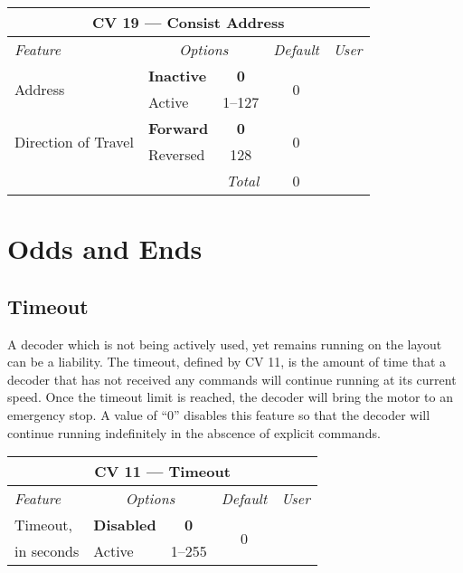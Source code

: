 \documentclass[12pt,letterpaper,draft]{memoir} %
\begin{document}
\label{CV19}
\begin{center}
\begin{tabular}{|l|lc|c|c|}
\hline
\multicolumn{5}{|c|}{\textbf{CV 19 --- Consist Address}} \\ \hline \hline
\textit{Feature} & \multicolumn{2}{c|}{\textit{Options}} & \textit{Default} & \textit{User} \\ \hline
\multirow{2}{*}{Address} & \textbf{Inactive} & \textbf{0} & \multirow{2}{*}{0} & \\
									  & Active & 1--127 & & \\ \hline
\multirow{2}{*}{Direction of Travel} & \textbf{Forward}	 & \textbf{0} & \multirow{2}{*}{0} &\\
																		& Reversed & 128 & & \\ \hline \hline
\multicolumn{3}{|r|}{\textit{Total}} & 0 &\\ \hline
\end{tabular}
\end{center}

\section{Odds and Ends}
\subsection{Timeout}
A decoder which is not being actively used, yet remains running on the layout can be a liability. The timeout, defined by CV 11, is the amount of time that a decoder that has not received any commands will continue running at its current speed. Once the timeout limit is reached, the decoder will bring the motor to an emergency stop. A value of ``0'' disables this feature so that the decoder will continue running indefinitely in the abscence of explicit commands.

\label{CV11}
\begin{center}
\begin{tabular}{|l|lc|c|c|}
\hline
\multicolumn{5}{|c|}{\textbf{CV 11 --- Timeout}} \\ \hline \hline
\textit{Feature} & \multicolumn{2}{c|}{\textit{Options}} & \textit{Default} & \textit{User} \\ \hline
Timeout,& \textbf{Disabled}	 & \textbf{0} & \multirow{2}{*}{0} &\\
in seconds & Active & 1--255 & & \\ \hline
\end{tabular}
\end{center}
\end{document}
